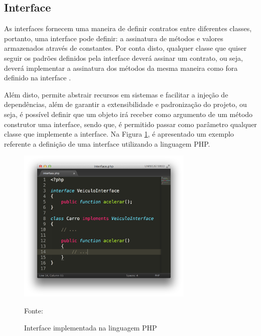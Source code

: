 \subsection{Interface}

As interfaces fornecem uma maneira de definir contratos entre diferentes
classes, portanto, uma interface pode definir: a assinatura de métodos e
valores armazenados através de constantes. Por conta disto, qualquer classe  que
quiser seguir os padrões definidos pela interface deverá assinar um contrato,
ou seja, deverá implementar a assinatura dos métodos da mesma maneira como  fora
definido na interface \cite{programmingPhp}.

Além disto, permite abstrair recursos em sistemas e facilitar a
injeção de dependências, além de garantir a extensibilidade e padronização do
projeto, ou seja, é possível definir que um objeto irá receber como argumento de
um método construtor uma interface, sendo que, é permitido passar como parâmetro
qualquer classe que implemente a interface. Na Figura
\ref{fig:interface}, é apresentado um exemplo referente a definição de uma 
interface utilizando a linguagem \acs{PHP}.

\begin{figure}[h!tb]
	\caption{Interface implementada na linguagem PHP}
	\label{fig:interface}

	\centering
	\includegraphics[width=0.75\textwidth]{images/interface.png}

	\centering
	\footnotesize Fonte: \fonteOAutor
\end{figure}

\FloatBarrier 	%

